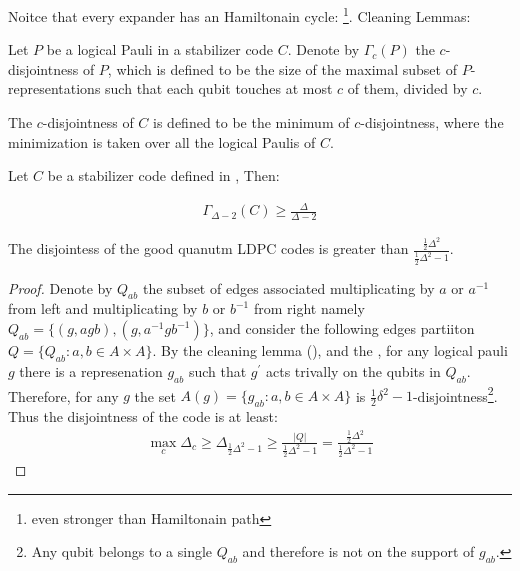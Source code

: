 \documentclass[manuscript,screen,review]{acmart}
\begin{document}
{Noitce that every expander has an Hamiltonain cycle: \cite{draganić2024hamiltonicityexpandersoptimalbounds}\footnote{even stronger than Hamiltonain path}.  Cleaning Lemmas: \cite{Bravyi_2009}\cite{cleaning_lemm_2}

\begin{definition}
Let $P$ be a logical Pauli in a stabilizer code $C$. Denote by $\Gamma_{c}(P)$ the $c$-disjointness of $P$, which is defined to be the size of the maximal subset of $P$-representations such that each qubit touches at most $c$ of them, divided by $c$. 


The $c$-disjointness of $C$ is defined to be the minimum of $c$-disjointness, where the minimization is taken over all the logical Paulis of $C$.
\end{definition}

\begin{claim}
  Let $C$ be a stabilizer code defined in , Then:


  \begin{equation*}
    \begin{split}
  \Gamma_{ \Delta - 2 }\left( C \right) \ge \frac{ \Delta }{  \Delta  - 2   }
    \end{split}
  \end{equation*}
\end{claim}


\newcommand{\Disc}{ \frac{ \frac{1}{2} \Delta^{2} }{\frac{1}{2} \Delta^{2} - 1  } } 

\begin{claim}
  The disjointess of the good quanutm LDPC codes is greater than $ \Disc $.
\end{claim}
\begin{proof}
  Denote by $Q_{ab}$ the subset of edges associated multiplicating by $a$ or $a^{-1}$ from left and multiplicating by $b$ or $b^{-1}$ from right namely $ Q_{ab} =  \{ (g, agb), (g, a^{-1}gb^{-1}) \} $, and consider the following edges partiiton $Q = \{ Q_{ab} : a,b \in A\times A \}$. By the cleaning lemma (), and the , for any logical pauli $g$ there is a represenation $g_{ab}$ such that $g^{\prime}$ acts trivally on the qubits in $Q_{ab}$. Therefore, for any $g$ the set $ A(g) = \{ g_{ab} : a,b \in A \times A \}$  is $ \frac{1}{2}\delta^{2}-1$-disjointness\footnote{Any qubit belongs to a single $Q_{ab}$ and therefore is not on the support of $g_{ab}$.}. Thus the disjointness of the code is at least: 
  \begin{equation*}
    \begin{split}
      \max_{c} \Delta_{c} \ge \Delta_{\frac{1}{2} \Delta^{2} - 1 } \ge \frac{  |Q|   }{\frac{1}{2} \Delta^{2} - 1  } = \Disc
    \end{split}
  \end{equation*} 
\end{proof}

}
\end{document}
